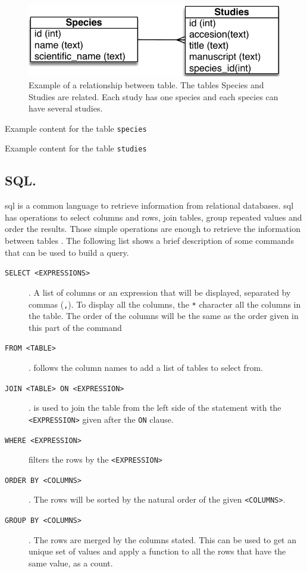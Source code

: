 \begin{figure}
\includegraphics{expVIP/Figures/miniER.pdf}
\caption[Example of a relationship between table.]{Example of a relationship between table. The tables Species and Studies are related. Each study has one species and each species can have several studies.}
\label{fig:expvip:miniER}
\end{figure}

\begin{table}
\caption[Species]{Example content for the table \texttt{species}}
\label{exp:tab:species}
\centering

\end{table}

\begin{table}
\caption[Studies]{Example content for the table \texttt{studies}}
\label{exp:tab:studies}
\centering

\end{table}

\subsection{SQL.}
\gls{sql} is a common language to retrieve information from relational databases. 
\acrshort{sql} has operations to select columns and rows, join tables, group repeated values and order the results. 
Those simple operations are enough to retrieve the information between tables \citep{Oracle2014}. 
The following list shows a brief description of some commands  that can be used to build a query.  

\begin{description}
\item[\texttt{SELECT <EXPRESSIONS> }]. A list of columns or an expression that will be displayed, separated by commas (\texttt{,}). To display all the columns, the \texttt{*} character  all the columns in the table. The order of the columns will be the same as the order given in this part of the command
\item[\texttt{FROM <TABLE>}]. follows the column names to add a list of tables to select from.
\item[\texttt{JOIN <TABLE> ON <EXPRESSION> }]. is used to join the table from the left side of the statement with the \texttt{<EXPRESSION>} given after the \texttt{ON} clause.  
\item[\texttt{WHERE <EXPRESSION>}] filters the rows by the \texttt{<EXPRESSION>}
\item[\texttt{ORDER BY <COLUMNS>}]. The rows will be sorted by the natural order of the given \texttt{<COLUMNS>}.  
\item[\texttt{GROUP BY <COLUMNS>}]. The rows are merged by the columns stated. This can be used to get an unique set of values and apply a function to all the rows that have the same value, as a count.
\end{description} 

